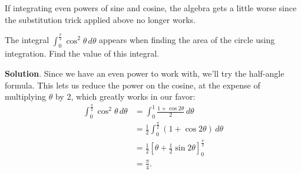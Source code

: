 \documentclass[10pt,]{book}
\theoremstyle{ptxplainnotitle}
\theoremstyle{ptxplaintitle}
\theoremstyle{ptxplainnotitle}
\theoremstyle{ptxplaintitle}
\theoremstyle{ptxplainnotitle}
\theoremstyle{ptxplaintitle}
\theoremstyle{ptxdefinitionnotitle}
\theoremstyle{ptxdefinitiontitle}
\theoremstyle{ptxdefinitionnotitle}
\theoremstyle{ptxdefinitiontitle}
\theoremstyle{ptxdefinitionnotitle}
\theoremstyle{ptxdefinitiontitle}
\theoremstyle{ptxdefinitionnotitle}
\theoremstyle{ptxdefinitiontitle}
\theoremstyle{ptxdefinitionnotitle}
\theoremstyle{ptxdefinitiontitle}
\numberwithin{equation}{section}
\begin{document}
\hypertarget{p-528}{}%
If integrating even powers of sine and cosine, the algebra gets a little worse since the substitution trick applied above no longer works.%
\begin{example}\label{example-integrating-even-powers-of-cosine}
\hypertarget{p-529}{}%
The integral \(\int_{0}^{\frac{\pi}{2}}\cos^{2}\theta\,d\theta\) appears when finding the area of the circle using integration. Find the value of this integral.%
\par\smallskip%
\noindent\textbf{Solution}.\hypertarget{solution-116}{}\quad%
\hypertarget{p-530}{}%
Since we have an even power to work with, we'll try the half-angle formula. This lets us reduce the power on the cosine, at the expense of multiplying \(\theta\) by \(2\), which greatly works in our favor:%
%
\begin{align*}
\int_{0}^{\frac{\pi}{2}}\cos^{2}\theta\,d\theta & =\int_{0}^{1}\frac{1 + \cos2\theta}{2}\,d\theta \\
& = \frac{1}{2}\int_{0}^{\frac{\pi}{2}}(1 + \cos2\theta)\,d\theta \\
& = \frac{1}{2}\left[\theta + \frac{1}{2}\sin2\theta\right]_{0}^{\frac{\pi}{2}} \\
& = \frac{\pi}{4}. 
\end{align*}
\end{example}
\typeout{************************************************}
\typeout{************************************************}
\end{document}
